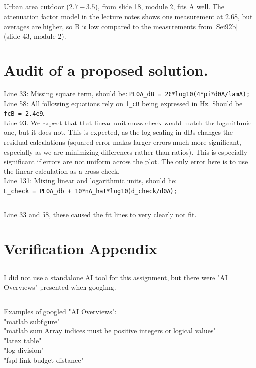 \documentclass[]{article}
\begin{document}
\subsection{}
Urban area outdoor ($2.7-3.5$), from slide 18, module 2, fits A well.
The attenuation factor model in the lecture notes shows one measurement at $2.68$, but averages are higher, so B is low compared to the measurements from [Sei92b] (slide 43, module 2).

\section{Audit of a proposed solution.}
Line 33: Missing square term, should be: \verb|PL0A_dB = 20*log10(4*pi*d0A/lamA);|
Line 58: All following equations rely on \verb|f_cB| being expressed in Hz. Should be \verb|fcB = 2.4e9|.\\

Line 93: We expect that that linear unit cross check would match the logarithmic one, but it does not. This is expected, as the log scaling in dBs changes the residual calculations (squared error makes larger errors much more significant, especially as we are minimizing differences rather than ratios). This is especially significant if errors are not uniform across the plot. The only error here is to use the linear calculation as a cross check.\\

Line 131: Mixing linear and logarithmic units, should be:\\ 
\verb|L_check = PL0A_db + 10*nA_hat*log10(d_check/d0A);|

\subsection{}
Line 33 and 58, these caused the fit lines to very clearly not fit. 

\section{Verification Appendix}
\subsection{}
I did not use a standalone AI tool for this assignment, but there were "AI Overviews" presented when googling. 
\subsection{}
Examples of googled "AI Overviews":\\
"matlab subfigure"\\
"matlab sum Array indices must be positive integers or logical values"\\
"latex table"\\
"log division"\\
"fspl link budget distance"\\
\end{document}
